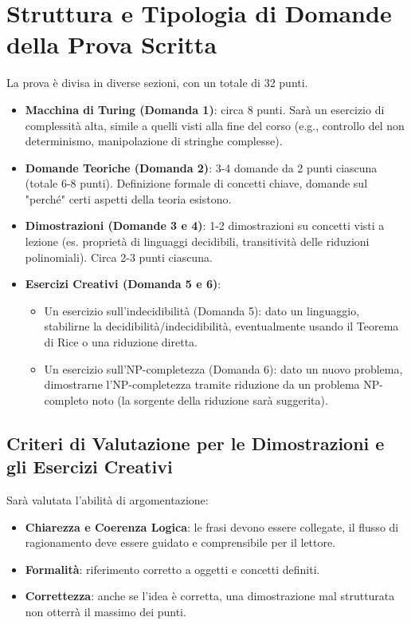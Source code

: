 \documentclass[a4paper]{article}
\begin{document}
\section{Struttura e Tipologia di Domande della Prova Scritta}
La prova è divisa in diverse sezioni, con un totale di 32 punti.
\begin{itemize}
    \item \textbf{Macchina di Turing (Domanda 1)}: circa 8 punti. Sarà un esercizio di complessità alta, simile a quelli visti alla fine del corso (e.g., controllo del non determinismo, manipolazione di stringhe complesse).
    \item \textbf{Domande Teoriche (Domanda 2)}: 3-4 domande da 2 punti ciascuna (totale 6-8 punti). Definizione formale di concetti chiave, domande sul "perché" certi aspetti della teoria esistono.
    \item \textbf{Dimostrazioni (Domande 3 e 4)}: 1-2 dimostrazioni su concetti visti a lezione (es. proprietà di linguaggi decidibili, transitività delle riduzioni polinomiali). Circa 2-3 punti ciascuna.
    \item \textbf{Esercizi Creativi (Domanda 5 e 6)}:
    \begin{itemize}
        \item Un esercizio sull'indecidibilità (Domanda 5): dato un linguaggio, stabilirne la decidibilità/indecidibilità, eventualmente usando il Teorema di Rice o una riduzione diretta.
        \item Un esercizio sull'NP-completezza (Domanda 6): dato un nuovo problema, dimostrarne l'NP-completezza tramite riduzione da un problema NP-completo noto (la sorgente della riduzione sarà suggerita).
    \end{itemize}
\end{itemize}

\subsection{Criteri di Valutazione per le Dimostrazioni e gli Esercizi Creativi}
Sarà valutata l'abilità di argomentazione:
\begin{itemize}
    \item \textbf{Chiarezza e Coerenza Logica}: le frasi devono essere collegate, il flusso di ragionamento deve essere guidato e comprensibile per il lettore.
    \item \textbf{Formalità}: riferimento corretto a oggetti e concetti definiti.
    \item \textbf{Correttezza}: anche se l'idea è corretta, una dimostrazione mal strutturata non otterrà il massimo dei punti.
\end{itemize}
\end{document}
